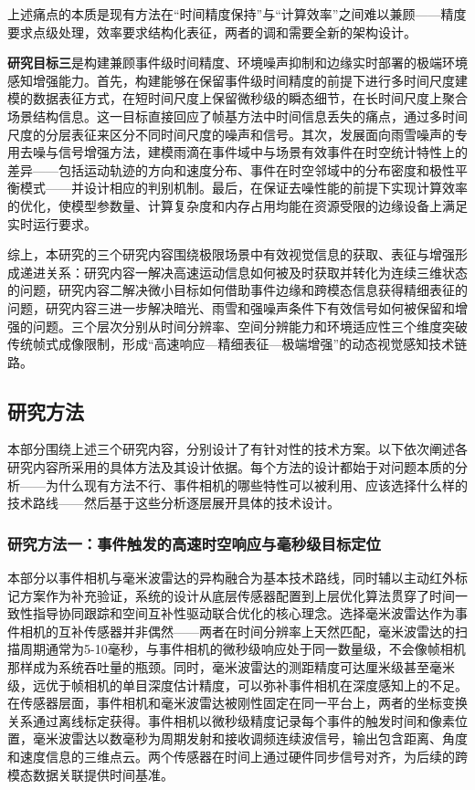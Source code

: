 上述痛点的本质是现有方法在“时间精度保持”与“计算效率”之间难以兼顾——精度要求点级处理，效率要求结构化表征，两者的调和需要全新的架构设计。

\textbf{研究目标三}是构建兼顾事件级时间精度、环境噪声抑制和边缘实时部署的极端环境感知增强能力。首先，构建能够在保留事件级时间精度的前提下进行多时间尺度建模的数据表征方式，在短时间尺度上保留微秒级的瞬态细节，在长时间尺度上聚合场景结构信息。这一目标直接回应了帧基方法中时间信息丢失的痛点，通过多时间尺度的分层表征来区分不同时间尺度的噪声和信号。其次，发展面向雨雪噪声的专用去噪与信号增强方法，建模雨滴在事件域中与场景有效事件在时空统计特性上的差异——包括运动轨迹的方向和速度分布、事件在时空邻域中的分布密度和极性平衡模式——并设计相应的判别机制。最后，在保证去噪性能的前提下实现计算效率的优化，使模型参数量、计算复杂度和内存占用均能在资源受限的边缘设备上满足实时运行要求。

综上，本研究的三个研究内容围绕极限场景中有效视觉信息的获取、表征与增强形成递进关系：研究内容一解决高速运动信息如何被及时获取并转化为连续三维状态的问题，研究内容二解决微小目标如何借助事件边缘和跨模态信息获得精细表征的问题，研究内容三进一步解决暗光、雨雪和强噪声条件下有效信号如何被保留和增强的问题。三个层次分别从时间分辨率、空间分辨能力和环境适应性三个维度突破传统帧式成像限制，形成“高速响应—精细表征—极端增强”的动态视觉感知技术链路。

\subsection{研究方法}

本部分围绕上述三个研究内容，分别设计了有针对性的技术方案。以下依次阐述各研究内容所采用的具体方法及其设计依据。每个方法的设计都始于对问题本质的分析——为什么现有方法不行、事件相机的哪些特性可以被利用、应该选择什么样的技术路线——然后基于这些分析逐层展开具体的技术设计。

\subsubsection{研究方法一：事件触发的高速时空响应与毫秒级目标定位}

本部分以事件相机与毫米波雷达的异构融合为基本技术路线，同时辅以主动红外标记方案作为补充验证，系统的设计从底层传感器配置到上层优化算法贯穿了时间一致性指导协同跟踪和空间互补性驱动联合优化的核心理念。选择毫米波雷达作为事件相机的互补传感器并非偶然——两者在时间分辨率上天然匹配，毫米波雷达的扫描周期通常为5-10毫秒，与事件相机的微秒级响应处于同一数量级，不会像帧相机那样成为系统吞吐量的瓶颈。同时，毫米波雷达的测距精度可达厘米级甚至毫米级，远优于帧相机的单目深度估计精度，可以弥补事件相机在深度感知上的不足。在传感器层面，事件相机和毫米波雷达被刚性固定在同一平台上，两者的坐标变换关系通过离线标定获得。事件相机以微秒级精度记录每个事件的触发时间和像素位置，毫米波雷达以数毫秒为周期发射和接收调频连续波信号，输出包含距离、角度和速度信息的三维点云。两个传感器在时间上通过硬件同步信号对齐，为后续的跨模态数据关联提供时间基准。

